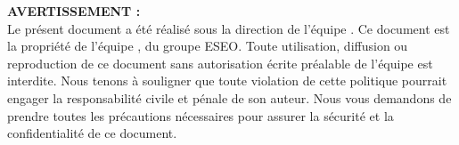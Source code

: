 \noindent %
\textbf{AVERTISSEMENT :} %
\vspace{3mm} \\
Le présent document a été réalisé sous la direction de l'équipe {\teamName}. Ce document est la propriété de l'équipe {\teamName}, du groupe ESEO.
Toute utilisation, diffusion ou reproduction de ce document sans autorisation écrite préalable de l'équipe {\teamName} est interdite. 
Nous tenons à souligner que toute violation de cette politique pourrait engager la responsabilité civile et pénale de son auteur. 
Nous vous demandons de prendre toutes les précautions nécessaires pour assurer la sécurité et la confidentialité de ce document.